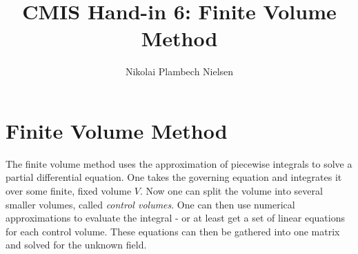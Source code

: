 \documentclass[sigconf]{acmart}
\begin{document}
%
\title{CMIS Hand-in 6: Finite Volume Method}

\author{Nikolai Plambech Nielsen}


\maketitle

\section{Finite Volume Method}
The finite volume method uses the approximation of piecewise integrals to solve a partial differential equation. One takes the governing equation and integrates it over some finite, fixed volume $ V $. Now one can split the volume into several smaller volumes, called \textit{control volumes}. One can then use numerical approximations to evaluate the integral - or at least get a set of linear equations for each control volume. These equations can then be gathered into one matrix and solved for the unknown field.
\end{document}
